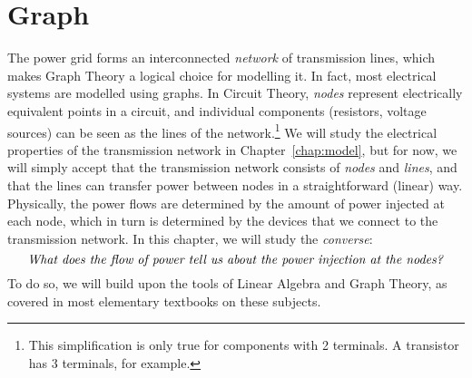 \documentclass[main.tex]{subfiles}
\begin{document}

\section{Graph}
The power grid forms an interconnected \emph{network} of transmission lines, which makes Graph Theory a logical choice for modelling it.
In fact, most electrical systems are modelled using graphs. In Circuit Theory, \emph{nodes} represent electrically equivalent points in a circuit, and individual components (resistors, voltage sources) can be seen as the lines of the network.\footnote{This simplification is only true for components with 2 terminals. A transistor has 3 terminals, for example.}
We will study the electrical properties of the transmission network in Chapter~\ref{chap:model}, but for now, we will simply accept that the transmission network consists of \emph{nodes} and \emph{lines}, and that the lines can transfer power between nodes in a straightforward (linear) way. Physically, the power flows are determined by the amount of power injected at each node, which in turn is determined by the devices that we connect to the transmission network. In this chapter, we will study the \emph{converse}:
\[
\text{\textit{What does the flow of power tell us about the power injection at the nodes?}}
\]
To do so, we will build upon the tools of Linear Algebra and Graph Theory, as covered in most elementary textbooks on these subjects.
\end{document}
